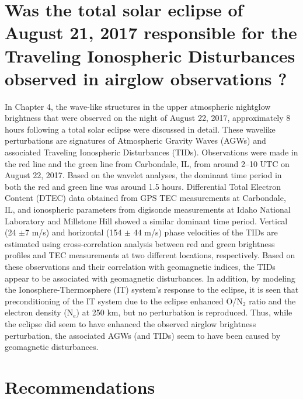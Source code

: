 \documentclass[crop=false,class=mitthesis,oneside,font=12pt]{standalone}
\begin{document}
\section{Was the total solar eclipse of August 21, 2017 responsible for the Traveling Ionospheric Disturbances observed in airglow observations ?}
In Chapter 4, the wave-like structures in the upper atmospheric nightglow brightness that were observed on the night of August 22, 2017, approximately 8 hours following a total solar eclipse were discussed in detail. These wavelike perturbations are signatures of  Atmospheric Gravity Waves (AGWs) and associated Traveling Ionospheric Disturbances (TIDs). Observations were made in the red line and the green line from Carbondale, IL, from around 2--10 UTC on August 22, 2017. Based on the wavelet analyses, the dominant time period in both the red and green line was around 1.5 hours. Differential Total Electron Content (DTEC) data obtained from GPS TEC measurements at Carbondale, IL, and ionospheric parameters from digisonde measurements at Idaho National Laboratory and Millstone Hill showed a similar dominant time period. Vertical (24 $\pm$7 m/s) and horizontal (154 $\pm$ 44 m/s) phase velocities of the TIDs are estimated using cross-correlation analysis between red and green brightness profiles and TEC measurements at two different locations, respectively. Based on these observations and their correlation with geomagnetic indices, the TIDs appear to be associated with geomagnetic disturbances. In addition, by modeling the Ionosphere-Thermosphere (IT) system's response to the eclipse, it is seen that preconditioning of the IT system due to the eclipse enhanced O/N$_2$ ratio and the electron density (N$_e$) at 250 km, but no perturbation is reproduced. Thus, while the eclipse did seem to have enhanced the observed airglow brightness perturbation, the associated AGWs (and TIDs) seem to have been caused by geomagnetic disturbances.


\section{Recommendations} \label{sec:recommendations}
\end{document}

